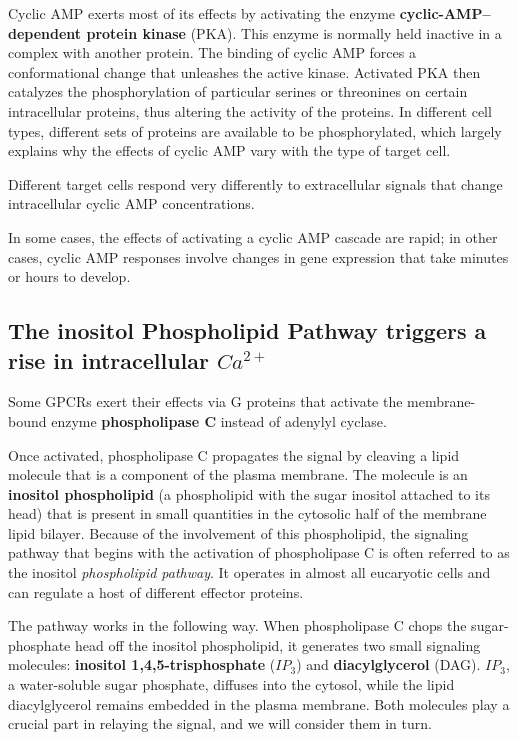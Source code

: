Cyclic AMP exerts most of its effects by activating the enzyme \textbf{cyclic-AMP–dependent protein kinase}
(PKA). This enzyme is normally
held inactive in a complex with another protein. The binding of cyclic
AMP forces a conformational change that unleashes the active kinase.
Activated PKA then catalyzes the phosphorylation of particular serines or
threonines on certain intracellular proteins, thus altering the activity of
the proteins. In different cell types, different sets of proteins are available
to be phosphorylated, which largely explains why the effects of cyclic
AMP vary with the type of target cell.

Different target cells respond very differently to extracellular signals that
change intracellular cyclic AMP concentrations.

In some cases, the effects of activating a cyclic AMP cascade are rapid;
in other cases, cyclic AMP responses involve changes in gene expression that take
minutes or hours to develop.

\subsection{The inositol Phospholipid Pathway triggers a rise in intracellular $Ca^{2+}$}

Some GPCRs exert their effects via G proteins that activate the membrane-bound
enzyme \textbf{phospholipase C} instead of adenylyl cyclase.

Once activated, phospholipase C propagates the signal by cleaving a lipid
molecule that is a component of the plasma membrane. The molecule is
an \textbf{inositol phospholipid} (a phospholipid with the sugar inositol attached
to its head) that is present in small quantities in the cytosolic half of the
membrane lipid bilayer. Because of the involvement of
this phospholipid, the signaling pathway that begins with the activation
of phospholipase C is often referred to as the inositol \textit{phospholipid pathway}.
It operates in almost all eucaryotic cells and can regulate a host of
different effector proteins.

The pathway works in the following way. When phospholipase C chops
the sugar-phosphate head off the inositol phospholipid, it generates two
small signaling molecules: \textbf{inositol 1,4,5-trisphosphate} ($IP_3$) and \textbf{diacylglycerol}
(DAG). $IP_3$, a water-soluble sugar phosphate, diffuses into the
cytosol, while the lipid diacylglycerol remains embedded in the plasma
membrane. Both molecules play a crucial part in relaying the signal, and
we will consider them in turn.

